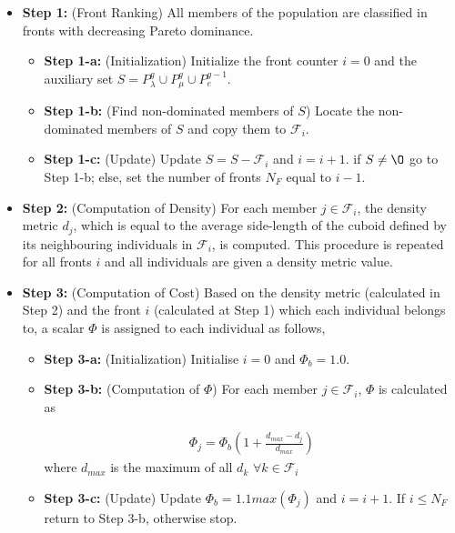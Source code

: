 \begin{itemize}
\item[]{\bf Step 1:}  (Front Ranking) All members of the population are classified in fronts with decreasing Pareto dominance.  
\begin{itemize}
\item[]{\bf Step 1-a:}  (Initialization) Initialize the front counter $i=0$ and the auxiliary set $S=P_{\lambda}^g \cup P_{\mu}^g \cup P_{e}^{g-1}$.

\item[]{\bf Step 1-b:}  (Find non-dominated members of $S$) Locate the non-dominated members of $S$ and copy them to $\mathcal{F}_i$. 

\item[]{\bf Step 1-c:}  (Update) Update $S=S-\mathcal{F}_i$ %
and $i=i+1$. if $S\neq\O$ go to Step 1-b; else, set the number of fronts $N_F$ equal to $i-1$.
\end{itemize}
\item[]{\bf Step 2:}  (Computation of Density) For each member $j \in \mathcal{F}_i$, the density metric $d_j$, which is equal to the average side-length of the cuboid defined by its neighbouring individuals in $\mathcal{F}_i$, is computed. This procedure is repeated for all fronts $i$ and all individuals are given a density metric value.

\item[]{\bf Step 3:}  (Computation of Cost) Based on the density metric (calculated in Step 2) and the front $i$ (calculated at Step 1) which each individual belongs to, a scalar $\Phi$ is assigned to each individual as follows,
\begin{itemize}
\item[]{\bf Step 3-a:}  (Initialization) Initialise $i=0$ and $\Phi_b=1.0$.
\item[]{\bf Step 3-b:}  (Computation of $\Phi$) For each member $j \in \mathcal{F}_i$, $\Phi$ is calculated as

\begin{eqnarray}
	\nonumber
	\Phi_j= \Phi_b(1+\frac{d_{max}-d_j}{d_{max}}) 
\end{eqnarray} 
where $d_{max}$ is the maximum of all $d_k$ $\forall k \in \mathcal{F}_i$   
\item[]{\bf Step 3-c:}  (Update) Update $\Phi_b=1.1max(\Phi_j)$ and $i=i+1$. If $i \leq N_F$ return to Step 3-b, otherwise stop. 
\end{itemize}
\end{itemize}


